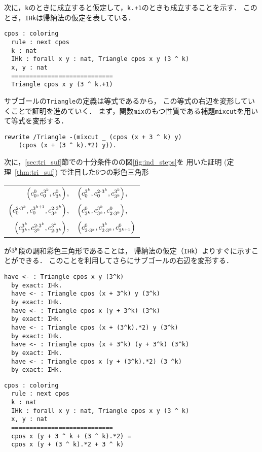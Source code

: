 次に，{\tt{k}}のときに成立すると仮定して，{\tt{k.+1}}のときも成立することを示す．
このとき，{\tt{IHk}}は帰納法の仮定を表している．
\begin{lstlisting}[language=Coq]
  cpos : coloring
  rule : next cpos
  k : nat
  IHk : forall x y : nat, Triangle cpos x y (3 ^ k)
  x, y : nat
  ============================
  Triangle cpos x y (3 ^ k.+1)
\end{lstlisting}
サブゴールの{\tt{Triangle}}の定義は等式であるから，
この等式の右辺を変形していくことで証明を進めていく．
まず，関数{\tt{mix}}のもつ性質である補題{\tt{mixcut}}を用いて等式を変形する．
\begin{lstlisting}[language=Coq]
  rewrite /Triangle -(mixcut _ (cpos (x + 3 ^ k) y)
    (cpos (x + (3 ^ k).*2) y)).
\end{lstlisting}
次に，\ref{sec:tri_suf}節での十分条件のの図\ref{fig:ind_steps}を
用いた証明 (定理~\ref{thm:tri_suf}) で注目した6つの彩色三角形
\begin{center}
  \begin{tabular}{rl}
    $\left(c^{0}_{0},c^{3^{k}}_{0},c^{0}_{3^{k}}\right)$,
    &
    $\left(c^{3^{k}}_{0},c^{2\cdot3^{k}}_{0},c^{3^{k}}_{3^{k}}\right)$,
    \\
    $\left(c^{2\cdot3^{k}}_{0},c^{3^{k+1}}_{0},c^{2\cdot3^{k}}_{3^{k}}\right)$,
    &
    $\left(c^{0}_{3^{k}},c^{3^{k}}_{3^{k}},c^{0}_{2\cdot3^{k}}\right)$,
    \\
    $\left(c^{3^{k}}_{3^{k}},c^{2\cdot3^{k}}_{3^{k}},c^{3^{k}}_{2\cdot3^{k}}\right)$,
    &
    $\left(c^{0}_{2\cdot3^{k}},c^{3^{k}}_{2\cdot3^{k}},c^{0}_{3^{k+1}}\right)$
  \end{tabular}
\end{center}
が$3^{\tt{k}}$段の調和彩色三角形であることは，
帰納法の仮定（{\tt{IHk}}）よりすぐに示すことができる．
このことを利用してさらにサブゴールの右辺を変形する．
\begin{lstlisting}[language=Coq]
  have <- : Triangle cpos x y (3^k)
  by exact: IHk.
  have <- : Triangle cpos (x + 3^k) y (3^k)
  by exact: IHk.
  have <- : Triangle cpos x (y + 3^k) (3^k)
  by exact: IHk.
  have <- : Triangle cpos (x + (3^k).*2) y (3^k)
  by exact: IHk.
  have <- : Triangle cpos (x + 3^k) (y + 3^k) (3^k)
  by exact: IHk. 
  have <- : Triangle cpos x (y + (3^k).*2) (3 ^k)
  by exact: IHk.
\end{lstlisting}
\begin{lstlisting}[language=Coq]
  cpos : coloring
  rule : next cpos
  k : nat
  IHk : forall x y : nat, Triangle cpos x y (3 ^ k)
  x, y : nat
  ============================
  cpos x (y + 3 ^ k + (3 ^ k).*2) =
  cpos x (y + (3 ^ k).*2 + 3 ^ k)
\end{lstlisting}
